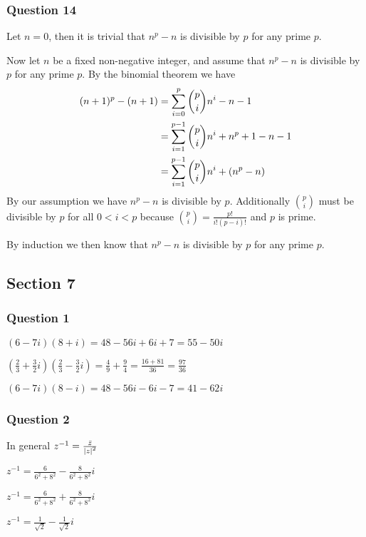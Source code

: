 \documentclass{article}
\begin{document}
\subsubsection{Question 14}

Let $n = 0$, then it is trivial that $n^p - n$ is divisible by $p$ for any prime $p$.

Now let $n$ be a fixed non-negative integer, and assume that $n^p-n$ is divisible by $p$ for any prime $p$. By the binomial theorem we have
\begin{align*}
(n+1)^p - (n+1)
&= \sum\limits_{i=0}^{p}  {\binom{p}{i}n^i} -n-1 \\
&= \sum\limits_{i=1}^{p-1}  {\binom{p}{i}n^i} +n^p+1-n-1 \\
&= \sum\limits_{i=1}^{p-1}  {\binom{p}{i}n^i} +\left(n^p-n\right)
\end{align*}
By our assumption we have $n^p-n$ is divisible by $p$. Additionally $\binom pi$ must be divisible by $p$ for all $0 < i < p$ because $\binom pi = \frac{p!}{i!(p-i)!}$ and $p$ is prime.

By induction we then know that $n^p-n$ is divisible by $p$ for any prime $p$.

\subsection{Section 7}
\subsubsection{Question 1}

 $(6-7i)(8+i) = 48 - 56i + 6i + 7 = 55-50i$

 $(\frac 23 + \frac 32i)(\frac23 - \frac 32i) = \frac49+\frac94=\frac{16+81}{36} = \frac{97}{36}$

 $(6-7i)(8-i) = 48-56i-6i-7 = 41-62i$

\subsubsection{Question 2}

In general $z^{-1} = \frac{\bar z}{\left|{z}\right|^2}$

 $z^{-1} = \frac{6}{6^2+8^2} - \frac8{6^2+8^2}i$

 $z^{-1} = \frac{6}{6^2+8^2} + \frac8{6^2+8^2}i$

 $z^{-1} = \frac1{\sqrt2} - \frac1{\sqrt 2}i$
\end{document}
